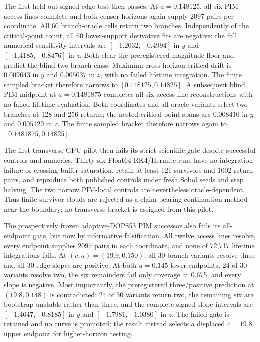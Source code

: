 The first held-out signed-edge test then passes.  At $a=0.148125$, all six PIM
access lines complete and both censor horizons again supply 2097 pairs per
coordinate.  All 60 branch-oracle cells return two branches.  Independently of
the critical-point count, all 60 lower-support derivative fits are negative:
the full numerical-sensitivity intervals are $[-1.2032,-0.4994]$ in $y$ and
$[-1.4185,-0.8476]$ in $z$.  Both clear the preregistered magnitude floor and
predict the blind two-branch class.  Maximum cross-horizon critical drift is
$0.009643$ in $y$ and $0.005037$ in $z$, with no failed lifetime integration.
The finite sampled bracket therefore narrows to $[0.148125,0.14825]$.  A
subsequent blind PIM midpoint at $a=0.1481875$ completes all six access-line
reconstructions with no failed lifetime evaluation.  Both coordinates and all
oracle variants select two branches at 128 and 256 returns; the nested
critical-point spans are $0.008410$ in $y$ and $0.005129$ in $z$.  The finite
sampled bracket therefore narrows again to $[0.1481875,0.14825]$.

The first transverse GPU pilot then fails its strict scientific gate despite
successful controls and numerics.  Thirty-six Float64 RK4/Hermite runs have no
integration failure or crossing-buffer saturation, retain at least 121
survivors and 1002 return pairs, and reproduce both published controls under
fresh Sobol seeds and step halving.  The two narrow PIM-local controls are
nevertheless oracle-dependent.  Thus finite survivor clouds are rejected as a
claim-bearing continuation method near the boundary; no transverse bracket is
assigned from this pilot.

The prospectively frozen adaptive-DOP853 PIM successor also fails its
all-endpoint gate, but now by informative falsification.  All twelve access
lines resolve, every endpoint supplies 2097 pairs in each coordinate, and none
of 72,717 lifetime integrations fails.  At $(c,a)=(19.9,0.150)$, all 30 branch
variants resolve three and all 30 edge slopes are positive.  At both
$a=0.145$ lower endpoints, 24 of 30 variants resolve two, the six remainders
fail only coverage at 0.675, and every slope is negative.  Most importantly,
the preregistered three/positive prediction at $(19.8,0.148)$ is contradicted:
24 of 30 variants return two, the remaining six are bootstrap-unstable rather
than three, and the complete signed-slope intervals are
$[-1.4647,-0.8185]$ in $y$ and $[-1.7981,-1.0380]$ in $z$.  The failed gate is
retained and no curve is promoted; the result instead selects a displaced
$c=19.8$ upper endpoint for higher-horizon testing.

